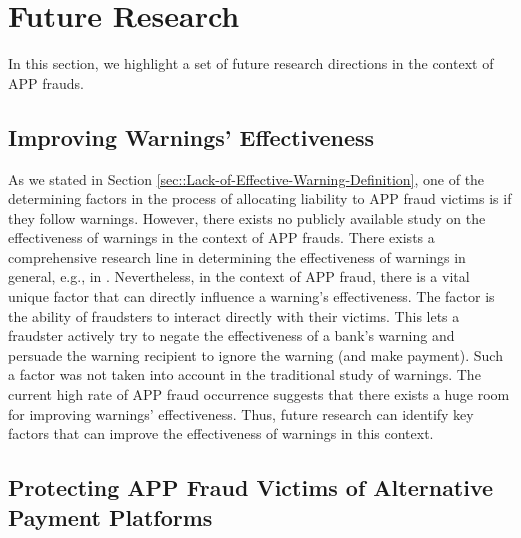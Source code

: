 
\vspace{-2mm}
\section{Future Research}\label{sec::Future-Research}


In this section, we highlight a set of future research directions in the context of APP frauds. 




\subsection{Improving Warnings' Effectiveness}

As we stated in  Section \ref{sec::Lack-of-Effective-Warning-Definition},  one of the determining factors in the process of allocating liability to APP fraud victims is if they follow warnings. However,  there exists no publicly available study on the effectiveness of warnings in  the context of APP frauds. There exists a comprehensive research line in determining the effectiveness of warnings in general, e.g., in \cite{brinton2016users,felt2014experimenting,laughery2006designing}. 
%
%
Nevertheless, in the context of APP fraud, there is a vital unique factor that can directly influence a warning's effectiveness. The factor is the ability of  fraudsters to interact directly with their victims. This lets a fraudster actively try to negate the effectiveness of a bank's warning and persuade the warning recipient to ignore the warning (and make payment). Such a factor was not taken into account in the traditional study of warnings. The current high rate of  APP fraud occurrence suggests that there exists a huge room for improving warnings' effectiveness. Thus, future research can identify key factors that can improve the effectiveness of warnings in this context. 

\vspace{-2mm}
\subsection{Protecting APP Fraud Victims of Alternative Payment Platforms}

